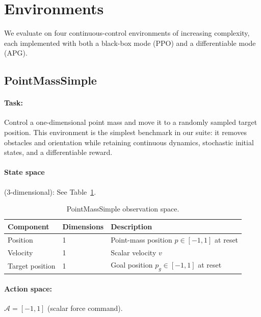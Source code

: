 \documentclass[11pt,a4paper]{article}
\newcommand{\cA}{\mathcal{A}}
\begin{document}
\section{Environments}
\label{sec:environments}

We evaluate on four continuous-control environments of increasing complexity, each implemented with both a black-box mode (PPO) and a differentiable mode (APG).

\subsection{PointMassSimple}
\label{sec:env_pointmass_simple}

\paragraph{Task:} Control a one-dimensional point mass and move it to a randomly sampled target position. This environment is the simplest benchmark in our suite: it removes obstacles and orientation while retaining continuous dynamics, stochastic initial states, and a differentiable reward.

\paragraph{State space} (3-dimensional): See Table~\ref{tab:pms_obs}.

\begin{table}[htbp]
  \centering
  \caption{PointMassSimple observation space.}
  \label{tab:pms_obs}
  \begin{tabular}{@{}lll@{}}
    \toprule
    \textbf{Component} & \textbf{Dimensions} & \textbf{Description} \\
    \midrule
    Position & 1 & Point-mass position $p \in [-1, 1]$ at reset \\
    Velocity & 1 & Scalar velocity $v$ \\
    Target position & 1 & Goal position $p_g \in [-1, 1]$ at reset \\
    \bottomrule
  \end{tabular}
\end{table}

\paragraph{Action space:} $\cA = [-1, 1]$ (scalar force command).
\end{document}
